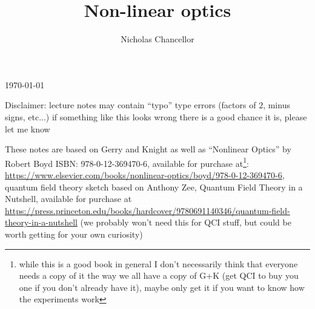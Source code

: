 \documentclass[english]{article}
\begin{document}
\title{Non-linear optics}
\author{Nicholas Chancellor}


\maketitle


\today %


{\small Disclaimer: lecture notes may contain ``typo'' type errors (factors of $2$, minus signs, etc...) if something like this looks wrong there is a good chance it is, please let me know}

These notes are based on Gerry and Knight as well as ``Nonlinear Optics'' by Robert Boyd ISBN: 978-0-12-369470-6, available for purchase at\footnote{while this is a good book in general I don't necessarily think that everyone needs a copy of  it the way we all have a copy of G+K (get QCI to buy you one if you don't already have it), maybe only get it if you want to know how the experiments work}:\\ \href{https://www.elsevier.com/books/nonlinear-optics/boyd/978-0-12-369470-6}{https://www.elsevier.com/books/nonlinear-optics/boyd/978-0-12-369470-6}, quantum field theory sketch based on Anthony Zee, Quantum Field Theory in a Nutshell, available for purchase at\\ \href{https://press.princeton.edu/books/hardcover/9780691140346/quantum-field-theory-in-a-nutshell}{https://press.princeton.edu/books/hardcover/9780691140346/quantum-field-theory-in-a-nutshell} (we probably won't need this for QCI stuff, but could be worth getting for your own curiosity)
\end{document}

